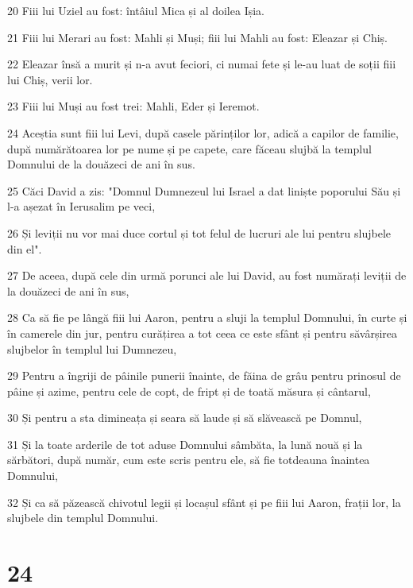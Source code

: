 \par 20 Fiii lui Uziel au fost: întâiul Mica și al doilea Ișia.
\par 21 Fiii lui Merari au fost: Mahli și Muși; fiii lui Mahli au fost: Eleazar și Chiș.
\par 22 Eleazar însă a murit și n-a avut feciori, ci numai fete și le-au luat de soții fiii lui Chiș, verii lor.
\par 23 Fiii lui Muși au fost trei: Mahli, Eder și Ieremot.
\par 24 Aceștia sunt fiii lui Levi, după casele părinților lor, adică a capilor de familie, după numărătoarea lor pe nume și pe capete, care făceau slujbă la templul Domnului de la douăzeci de ani în sus.
\par 25 Căci David a zis: "Domnul Dumnezeul lui Israel a dat liniște poporului Său și l-a așezat în Ierusalim pe veci,
\par 26 Și leviții nu vor mai duce cortul și tot felul de lucruri ale lui pentru slujbele din el".
\par 27 De aceea, după cele din urmă porunci ale lui David, au fost numărați leviții de la douăzeci de ani în sus,
\par 28 Ca să fie pe lângă fiii lui Aaron, pentru a sluji la templul Domnului, în curte și în camerele din jur, pentru curățirea a tot ceea ce este sfânt și pentru săvârșirea slujbelor în templul lui Dumnezeu,
\par 29 Pentru a îngriji de pâinile punerii înainte, de făina de grâu pentru prinosul de pâine și azime, pentru cele de copt, de fript și de toată măsura și cântarul,
\par 30 Și pentru a sta dimineața și seara să laude și să slăvească pe Domnul,
\par 31 Și la toate arderile de tot aduse Domnului sâmbăta, la lună nouă și la sărbători, după număr, cum este scris pentru ele, să fie totdeauna înaintea Domnului,
\par 32 Și ca să păzească chivotul legii și locașul sfânt și pe fiii lui Aaron, frații lor, la slujbele din templul Domnului.

\chapter{24}

